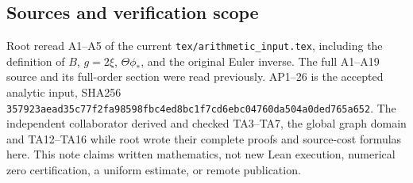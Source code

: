 \subsection{Sources and verification scope}\label{TAstage:TA-sources-and-verification-scope}

Root reread A1--A5 of the current \texttt{tex/arithmetic\_input.tex}, including the
definition of \(B\), \(g=2\xi\), \(\Theta\phi_*\), and the original Euler inverse. The full
A1--A19 source and its full-order section were read previously. AP1--26 is the
accepted analytic input, SHA256
\nolinkurl{357923aead35c77f2fa98598fbc4ed8bc1f7cd6ebc04760da504a0ded765a652}.
The independent collaborator derived and checked TA3--TA7, the global graph
domain and TA12--TA16 while root wrote their complete proofs and source-cost
formulas here. This note claims written mathematics, not new Lean execution,
numerical zero certification, a uniform estimate, or remote publication.
